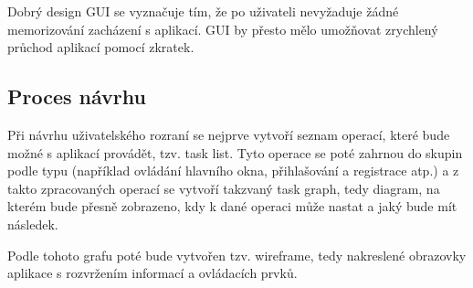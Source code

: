 Dobrý design GUI se vyznačuje tím, že po uživateli nevyžaduje žádné memorizování zacházení s aplikací. GUI by přesto mělo umožňovat zrychlený průchod aplikací pomocí zkratek\cite{toby2001expgui}.

\subsection{Proces návrhu}
Při návrhu uživatelského rozraní se nejprve vytvoří seznam operací, které bude možné s aplikací provádět, tzv. task list. Tyto operace se poté zahrnou do skupin podle typu (například ovládání hlavního okna, přihlašování a registrace atp.) a z takto zpracovaných operací se vytvoří takzvaný task graph, tedy diagram, na kterém bude přesně zobrazeno, kdy k dané operaci může nastat a jaký bude mít následek.

Podle tohoto grafu poté bude vytvořen tzv. wireframe, tedy nakreslené obrazovky aplikace s rozvržením informací a ovládacích prvků.

